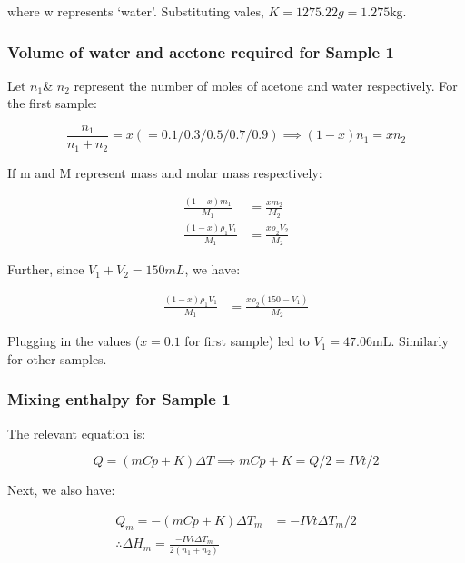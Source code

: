 \documentclass[11pt]{article}
\begin{document}
where w represents `water'. Substituting vales, \(K=1275.22g=1.275\)kg.

\hypertarget{volume-of-water-and-acetone-required-for-sample-1}{%
  \subsubsection{Volume of water and acetone required for Sample
    1}\label{volume-of-water-and-acetone-required-for-sample-1}}

Let \(n_1\)\& \(n_2\) represent the number of moles of acetone and water
respectively. For the first sample:

\begin{equation}
  \frac{n_1}{n_1+n_2}=x(=0.1/0.3/0.5/0.7/0.9)
  \implies (1-x)n_1=xn_2
\end{equation}

If m and M represent mass and molar mass respectively:

\begin{equation}
  \begin{split}
    \frac{(1-x)m_1}{M_1}&=\frac{xm_2}{M_2}\\
    \frac{(1-x)\rho_1V_1}{M_1}&=\frac{x\rho_2V_2}{M_2}
  \end{split}
\end{equation}

Further, since \(V_1+V_2=150mL\), we have:

\begin{equation}
  \begin{split}
    \frac{(1-x)\rho_1V_1}{M_1}&=\frac{x\rho_2(150-V_1)}{M_2}
  \end{split}
\end{equation}

Plugging in the values (\(x=0.1\) for first sample) led to
\(V_1=47.06\)mL. Similarly for other samples.

\hypertarget{mixing-enthalpy-for-sample-1}{%
  \subsubsection{Mixing enthalpy for Sample
    1}\label{mixing-enthalpy-for-sample-1}}

The relevant equation is:

\begin{equation}
  Q = (mCp+K)\Delta T\implies mCp+K=Q/2=IVt/2
\end{equation}

Next, we also have:

\begin{equation}
  \begin{split}
    Q_m=-(mCp+K)\Delta T_m&=-IVt\Delta T_m/2\\
    \therefore \Delta H_m=\frac{-IVt\Delta T_m}{2(n_1+n_2)}
  \end{split}
\end{equation}
\end{document}
